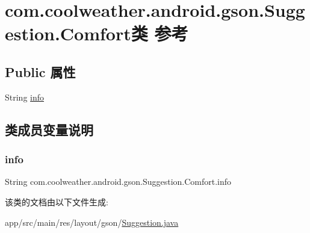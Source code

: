 \hypertarget{classcom_1_1coolweather_1_1android_1_1gson_1_1_suggestion_1_1_comfort}{}\section{com.\+coolweather.\+android.\+gson.\+Suggestion.\+Comfort类 参考}
\label{classcom_1_1coolweather_1_1android_1_1gson_1_1_suggestion_1_1_comfort}
\subsection*{Public 属性}
\begin{DoxyCompactItemize}
\item 
String \mbox{\hyperlink{classcom_1_1coolweather_1_1android_1_1gson_1_1_suggestion_1_1_comfort_a8a4d0c455b69a7a71612c531dad56e67}{info}}
\end{DoxyCompactItemize}


\subsection{类成员变量说明}
\mbox{\label{classcom_1_1coolweather_1_1android_1_1gson_1_1_suggestion_1_1_comfort_a8a4d0c455b69a7a71612c531dad56e67}} 
\subsubsection{\texorpdfstring{info}{info}}
{\footnotesize\ttfamily String com.\+coolweather.\+android.\+gson.\+Suggestion.\+Comfort.\+info}



该类的文档由以下文件生成\+:\begin{DoxyCompactItemize}
\item 
app/src/main/res/layout/gson/\mbox{\hyperlink{res_2layout_2gson_2_suggestion_8java}{Suggestion.\+java}}\end{DoxyCompactItemize}
